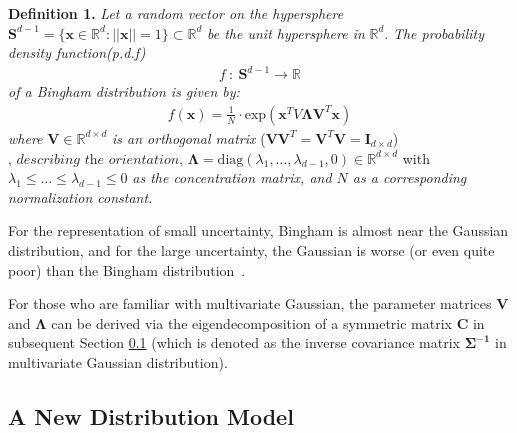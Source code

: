 \documentclass[micromachines,article,accept,pdftex,moreauthors]{Definitions/mdpi}
\begin{document}
\noindent\textbf{Definition 1.} \textit{Let a random vector on the hypersphere} $\boldsymbol{S}^{d-1} = \{ 
{\boldsymbol{x}} \in \mathbb{R}^{d}: ||{\boldsymbol{x}}|| = 1 \} \subset \mathbb{R}^{d}$ \textit{be the unit hypersphere in} $\mathbb{R}^{d}$. \textit{The probability density function(p.d.f)}
\begin{align*}
    f {\ :\ } \boldsymbol{S}^{d-1} \rightarrow \mathbb{R}
\end{align*}
\textit{of a Bingham distribution is given by:}
\begin{align*}
    f({\boldsymbol{x}}) = {\frac{1}{N}} \cdot \text{exp}({{\boldsymbol{x}}^{T}{V}\boldsymbol{\Lambda}\boldsymbol{V}^{T}{{\boldsymbol{x}}}})
\end{align*}
\textit{where} $\boldsymbol{V} \in \mathbb{R}^{d{\times}d}$ \textit{is an orthogonal matrix} ($\boldsymbol{V}\boldsymbol{V}^{T}=\boldsymbol{V}^{T}\boldsymbol{V}={\boldsymbol{I}}_{d{\times}d}$)
$ \textit{, describing the orientation, } \boldsymbol{\Lambda} = \text{diag}({\lambda_1}, \dots, \lambda_{d-1},\textit{0}) \in \mathbb{R}^{d \times d}$ with ${\lambda_1} \leq \dots \leq {\lambda_{d-1}} \leq 0$ \textit{as the concentration matrix, and $N$ as a corresponding normalization constant.}

\vspace{6pt}%

For the representation of small uncertainty, Bingham is almost near the Gaussian distribution, and for the large {uncertainty}, the Gaussian is worse (or even quite poor) than the Bingham \mbox{distribution \cite{kurzRecursiveEstimationOrientation2013}.} %

For those who are familiar with multivariate Gaussian, the parameter matrices $\boldsymbol{V}$ and $\boldsymbol{\Lambda}$ can be derived via the eigendecomposition of a symmetric matrix $\boldsymbol{C}$ in subsequent {Section \ref{3.2}} (which is denoted as the inverse covariance matrix $\boldsymbol{\Sigma^{-1}}$ in multivariate Gaussian distribution).


\subsection{A New Distribution Model}\label{3.2}
\end{document}
